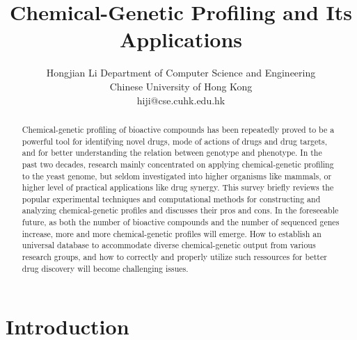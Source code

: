 \documentclass[12pt,conference,compsocconf]{article}
\begin{document}
\makeatletter
\g@addto@macro\maketitle{\thispagestyle{plain}}
\def\@oddfoot{\hfil \thepage \hfil}
\makeatother

\title{Chemical-Genetic Profiling and Its Applications}
\author
{
\IEEEauthorblockN
{
Hongjian Li
\IEEEauthorblockA
{
Department of Computer Science and Engineering\\
Chinese University of Hong Kong\\
hiji@cse.cuhk.edu.hk
}
}
}
\maketitle

\begin{abstract}

Chemical-genetic profiling of bioactive compounds has been repeatedly proved to be a powerful tool for identifying novel drugs, mode of actions of drugs and drug targets, and for better understanding the relation between genotype and phenotype. In the past two decades, research mainly concentrated on applying chemical-genetic profiling to the yeast genome, but seldom investigated into higher organisms like mammals, or higher level of practical applications like drug synergy. This survey briefly reviews the popular experimental techniques and computational methods for constructing and analyzing chemical-genetic profiles and discusses their pros and cons. In the foreseeable future, as both the number of bioactive compounds and the number of sequenced genes increase, more and more chemical-genetic profiles will emerge. How to establish an universal database to accommodate diverse chemical-genetic output from various research groups, and how to correctly and properly utilize such ressources for better drug discovery will become challenging issues.

\end{abstract}




\section{Introduction}
\end{document}
